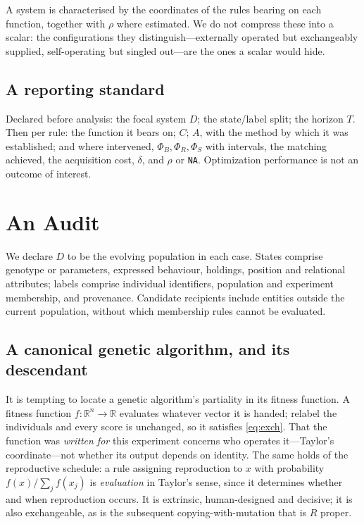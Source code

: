 \documentclass[review,3p,times]{elsarticle}
\begin{document}
A system is characterised by the coordinates of the rules bearing on each
function, together with $\rho$ where estimated. We do not compress these into
a scalar: the configurations they distinguish---externally operated but
exchangeably supplied, self-operating but singled out---are the ones a scalar
would hide.

\subsection{A reporting standard}

Declared before analysis: the focal system $D$; the state/label split; the
horizon $T$. Then per rule: the function it bears on; $C$; $A$, with the
method by which it was established; and where intervened,
$\Phi_B,\Phi_R,\Phi_S$ with intervals, the matching achieved, the
acquisition cost, $\delta$, and $\rho$ or \texttt{NA}. Optimization
performance is not an outcome of interest.

\section{An Audit}

We declare $D$ to be the evolving population in each case. States comprise
genotype or parameters, expressed behaviour, holdings, position and relational
attributes; labels comprise individual identifiers, population and experiment
membership, and provenance. Candidate recipients include entities outside the
current population, without which membership rules cannot be evaluated.

\subsection{A canonical genetic algorithm, and its descendant}

It is tempting to locate a genetic algorithm's partiality in its fitness
function. A fitness function $f:\mathbb{R}^n\rightarrow\mathbb{R}$ evaluates
whatever vector it is handed; relabel the individuals and every score is
unchanged, so it satisfies \eqref{eq:exch}. That the function was
\emph{written for} this experiment concerns who operates it---Taylor's
coordinate---not whether its output depends on identity. The same holds of the
reproductive schedule: a rule assigning reproduction to $x$ with probability
$f(x)/\sum_j f(x_j)$ is \emph{evaluation} in Taylor's sense, since it
determines whether and when reproduction occurs. It is extrinsic,
human-designed and decisive; it is also exchangeable, as is the subsequent
copying-with-mutation that is $R$ proper.
\end{document}
